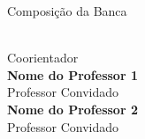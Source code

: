 \begin{folhadeaprovacao}

  \begin{center}
    {\ABNTEXchapterfont\large\imprimirautor}

    \vspace*{\fill}\vspace*{\fill}
    \begin{center}
      \ABNTEXchapterfont\bfseries\Large\imprimirtitulo
    \end{center}
    \vspace*{\fill}

    \hspace{.45\textwidth}
    \begin{minipage}{.5\textwidth}
        \imprimirpreambulo
    \end{minipage}%
    \vspace*{\fill}

    Composição da Banca
   \end{center}

   \begin{center}
   {\textbf{\imprimircoorientador} \\ Coorientador\\\vspace*{0.5cm}}
   {\textbf{Nome do Professor 1} \\ Professor Convidado\\\vspace*{0.5cm}}
   {\textbf{Nome do Professor 2} \\ Professor Convidado\\\vspace*{0.5cm}}
\end{center}   
   \begin{center}
    \vspace*{0.5cm}
    {\large\imprimirlocal}
    \par
    {\large\imprimirdata}
    \vspace*{1cm}
  \end{center}

\end{folhadeaprovacao}